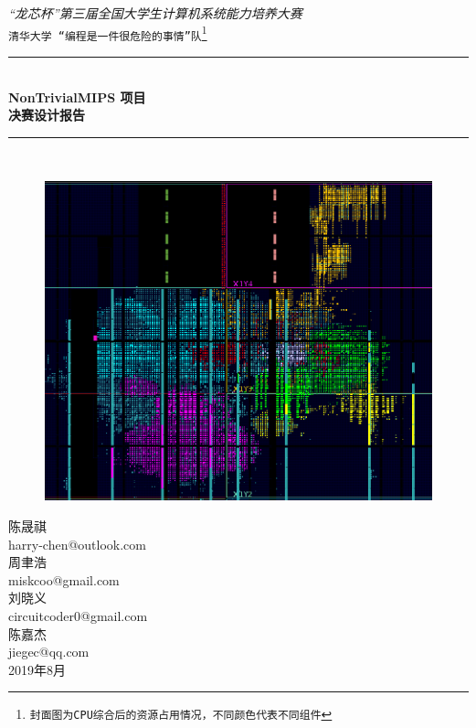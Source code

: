 \documentclass[fontset=fandol]{ctexrep}
\newcommand{\artdate}{2019年8月}
\begin{document}
\begin{titlepage}

    \newcommand{\HRule}{\rule{\linewidth}{0.5mm}}
  
    \vfill
    \center 
    
    \textit{\Large “龙芯杯”第三届全国大学生计算机系统能力培养大赛}\\[0.5cm] 
    \texttt{\Large 清华大学 “编程是一件很危险的事情”队\footnote{封面图为CPU综合后的资源占用情况，不同颜色代表不同组件}}
  
    \vspace{1.5 cm}
    \HRule \\[0.4cm]
    { \huge \bfseries NonTrivialMIPS 项目}\\[0.4cm]
    { \huge \bfseries 决赛设计报告}\\
    \HRule \\[1cm]
   
   \begin{figure}[H]
       \centering
       \includegraphics[width=0.5\linewidth]{colorful-new.png}
   \end{figure}
   
   \vspace{0.5 cm}
  
    \vspace{.5 cm}
    陈晟祺\\
    harry-chen@outlook.com\\
    \vspace{.5 cm}
    周聿浩\\
    miskcoo@gmail.com\\
    \vspace{.5 cm}
    刘晓义\\
    circuitcoder0@gmail.com\\
    \vspace{.5 cm}
    陈嘉杰\\
    jiegec@qq.com\\
  
    \vspace{1 cm}
    {\large \artdate}\\[3cm] 
  
  \vfill
  
\end{titlepage}
\end{document}
